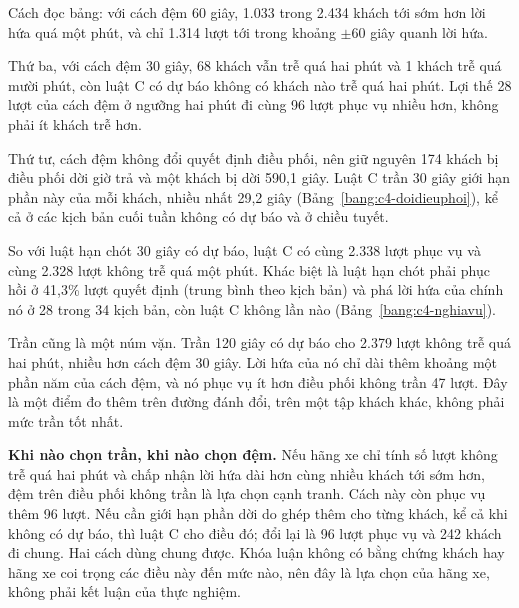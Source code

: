 Cách đọc bảng: với cách đệm 60 giây, 1.033 trong 2.434 khách tới sớm hơn lời hứa quá một phút, và chỉ 1.314 lượt tới
trong khoảng $\pm$60 giây quanh lời hứa.

Thứ ba, với cách đệm 30 giây, 68 khách vẫn trễ quá hai phút và 1 khách trễ quá mười phút, còn luật C có dự báo không
có khách nào trễ quá hai phút. Lợi thế 28 lượt của cách đệm ở ngưỡng hai phút đi cùng 96 lượt phục vụ nhiều hơn,
không phải ít khách trễ hơn.

Thứ tư, cách đệm không đổi quyết định điều phối, nên giữ nguyên 174 khách bị điều phối dời giờ trả và một khách bị
dời 590,1 giây. Luật C trần 30 giây giới hạn phần này của mỗi khách, nhiều nhất 29,2 giây
(Bảng~\ref{bang:c4-doidieuphoi}), kể cả ở các kịch bản cuối tuần không có dự báo và ở chiều tuyết.

So với luật hạn chót 30 giây có dự báo, luật C có cùng 2.338 lượt phục vụ và cùng 2.328 lượt không trễ quá một phút.
Khác biệt là luật hạn chót phải phục hồi ở 41,3\% lượt quyết định (trung bình theo kịch bản) và phá lời hứa của chính
nó ở 28 trong 34 kịch bản, còn luật C không lần nào (Bảng~\ref{bang:c4-nghiavu}).

Trần cũng là một núm vặn. Trần 120 giây có dự báo cho 2.379 lượt không trễ quá hai phút, nhiều hơn cách đệm 30 giây.
Lời hứa của nó chỉ dài thêm khoảng một phần năm của cách đệm, và nó phục vụ ít hơn điều phối không trần 47 lượt. Đây
là một điểm đo thêm trên đường đánh đổi, trên một tập khách khác, không phải mức trần tốt nhất.

\textbf{Khi nào chọn trần, khi nào chọn đệm.} Nếu hãng xe chỉ tính số lượt không trễ quá hai phút và chấp nhận lời
hứa dài hơn cùng nhiều khách tới sớm hơn, đệm trên điều phối không trần là lựa chọn cạnh tranh. Cách này còn phục vụ
thêm 96 lượt. Nếu cần giới hạn phần dời do ghép thêm cho từng khách, kể cả khi không có dự báo, thì luật C cho điều
đó; đổi lại là 96 lượt phục vụ và 242 khách đi chung. Hai cách dùng chung được. Khóa luận không có bằng chứng khách
hay hãng xe coi trọng các điều này đến mức nào, nên đây là lựa chọn của hãng xe, không phải kết luận của thực nghiệm.

